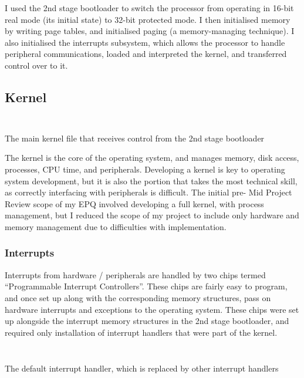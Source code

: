 \documentclass[a4paper,12pt]{article}
\begin{document}
I used the 2nd stage bootloader to switch the processor from operating in 16-bit real mode (its initial state) to 32-bit protected mode. I then initialised memory by writing page tables, and initialised paging (a memory-managing technique). I also initialised the interrupts subsystem, which allows the processor to handle peripheral communications, loaded and interpreted the kernel, and transferred control over to it.
\subsection{Kernel}
\begin{listing}[H]
\ifwindows
\inputminted[breaklines, linenos, numbersep=5pt, firstline=35, lastline=53]{c}{../os/kernel/main.c} %
\else
\inputminted[breaklines, linenos, numbersep=5pt, firstline=35, lastline=53]{c}{/home/vedantg/os/kernel/main.c} %
\fi
\caption{The main kernel file that receives control from the 2nd stage bootloader}
\label{listing:kernel}
\end{listing}
The kernel is the core of the operating system, and manages memory, disk access, processes, CPU time, and peripherals. Developing a kernel is key to operating system development, but it is also the portion that takes the most technical skill, as correctly interfacing with peripherals is difficult. The initial pre- Mid Project Review scope of my EPQ involved developing a full kernel, with process management, but I reduced the scope of my project to include only hardware and memory management due to difficulties with implementation.
\subsubsection{Interrupts}
Interrupts from hardware / peripherals are handled by two chips termed ``Programmable Interrupt Controllers''. These chips are fairly easy to program, and once set up along with the corresponding memory structures, pass on hardware interrupts and exceptions to the operating system. These chips were set up alongside the interrupt memory structures in the 2nd stage bootloader, and required only installation of interrupt handlers that were part of the kernel.
\begin{listing}[H]
\ifwindows
\inputminted[breaklines, linenos, numbersep=5pt, firstline=37, lastline=46]{c}{../os/kernel/arch/i386/interrupts.c} %
\else
\inputminted[breaklines, linenos, numbersep=5pt, firstline=37, lastline=46]{c}{/home/vedantg/os/kernel/arch/i386/interrupts.c} %
\fi
\caption{The default interrupt handler, which is replaced by other interrupt handlers}
\label{listing:interrupts}
\end{listing}
\end{document}
